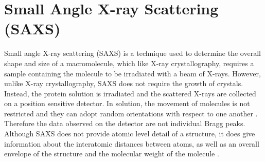 \section{Small Angle X-ray Scattering (SAXS)}
\label{sec:Small Angle X-ray Scattering}
    Small angle X-ray scattering (SAXS) is a technique used to determine the overall shape and size of a macromolecule, which like X-ray crystallography, requires a sample containing the molecule to be irradiated with a beam of X-rays.
    However, unlike X-ray crystallography, SAXS does not require the growth of crystals.
    Instead, the protein solution is irradiated and the scattered X-rays are collected on a position sensitive detector.
    In solution, the movement of molecules is not restricted and they can adopt random orientations with respect to one another \cite{blanchet2013small}.
    Therefore the data observed on the detector are not individual Bragg peaks.
    Although SAXS does not provide atomic level detail of a structure, it does give information about the interatomic distances between atoms, as well as an overall envelope of the structure and the molecular weight of the molecule \cite{pollack2011saxs}.

